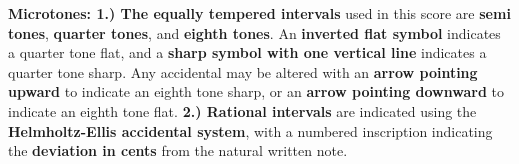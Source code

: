 \documentclass[12pt]{article}
\begin{document}
\begingroup
\textbf{Microtones: 1.) The equally tempered intervals} used in this score are \textbf{semi tones}, \textbf{quarter tones}, and \textbf{eighth tones}. An \textbf{inverted flat symbol} indicates a quarter tone flat, and a \textbf{sharp symbol with one vertical line} indicates a quarter tone sharp. Any accidental may be altered with an \textbf{arrow pointing upward} to indicate an eighth tone sharp, or an \textbf{arrow pointing downward} to indicate an eighth tone flat. \textbf{2.) Rational intervals} are indicated using the \textbf{Helmholtz-Ellis accidental system}, with a numbered inscription indicating the \textbf{deviation in cents} from the natural written note. \\
\endgroup
\end{document}
